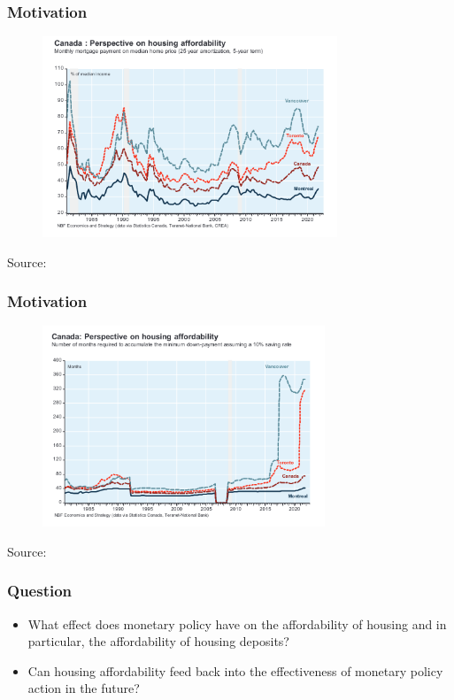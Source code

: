 \documentclass{beamer}
\begin{document}
\begin{frame}
    \frametitle{Motivation}
    \begin{figure}
        \includegraphics[height=6cm]{images/housing_affordability.png} 
        \centering   
    \end{figure}
    Source: \parencite{dahms_duchame_2022}
\end{frame}

\begin{frame}
    \frametitle{Motivation}
    \begin{figure}
        \includegraphics[height=6cm]{images/downpayment_time.png}
        \centering
    \end{figure}
    Source: \parencite{dahms_duchame_2022}
\end{frame}

\begin{frame}
    \frametitle{Question}
    \begin{itemize}
        \item What effect does monetary policy have on the affordability of housing and in particular, the affordability of housing deposits?
        \item Can housing affordability feed back into the effectiveness of monetary policy action in the future?
    \end{itemize}
\end{frame}
\end{document}
